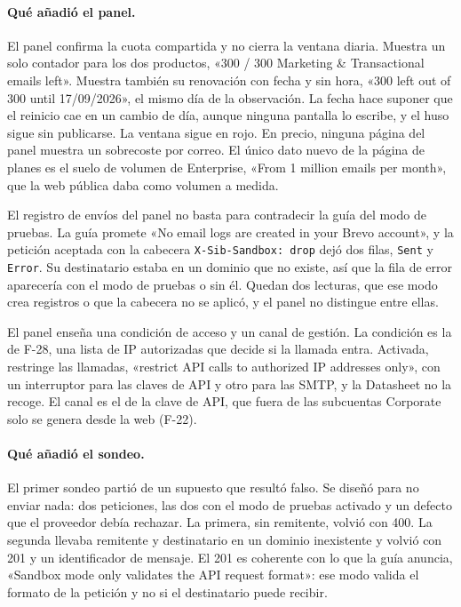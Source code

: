 \paragraph{Qué añadió el panel.} El panel confirma la cuota compartida y
no cierra la ventana diaria. Muestra un solo contador para los dos
productos, «300 / 300 Marketing \& Transactional emails left». Muestra
también su renovación con fecha y sin hora, «300 left out of 300 until
17/09/2026», el mismo día de la observación. La fecha hace suponer que el reinicio cae en un cambio de día, aunque ninguna pantalla lo escribe, y el huso sigue sin publicarse. La ventana sigue en rojo. En precio, ninguna página del panel muestra un sobrecoste por correo.
El único dato nuevo de la página de planes es el suelo de volumen de
Enterprise, «From 1 million emails per month», que la web pública daba
como volumen a medida.

El registro de envíos del panel no basta para contradecir la guía del modo de pruebas. La guía promete «No email logs
are created in your Brevo account», y la petición aceptada con la cabecera
\texttt{X-Sib-Sandbox: drop} dejó dos filas, \texttt{Sent} y
\texttt{Error}. Su destinatario estaba en un dominio que no existe, así que
la fila de error aparecería con el modo de pruebas o sin él. Quedan dos
lecturas, que ese modo crea registros o que la cabecera no se aplicó, y el
panel no distingue entre ellas.

El panel enseña una condición de acceso y un canal de gestión. La
condición es la de F-28, una lista de IP autorizadas que decide si la
llamada entra. Activada, restringe las llamadas, «restrict API calls to
authorized IP addresses only», con un interruptor para las claves de API y
otro para las SMTP, y la Datasheet no la recoge. El canal es el de la clave
de API, que fuera de las subcuentas Corporate solo se genera desde la web
(F-22).

\paragraph{Qué añadió el sondeo.} El primer sondeo partió de un supuesto que resultó falso. Se diseñó para no enviar nada: dos peticiones, las dos con el modo de pruebas activado y un defecto que el proveedor debía rechazar. La primera, sin remitente, volvió con 400. La segunda llevaba remitente y destinatario en un dominio inexistente y volvió con 201 y un identificador de mensaje. El 201 es coherente con lo que la guía anuncia, «Sandbox mode only validates the API request format»: ese modo valida el formato de la petición y no si el destinatario puede recibir.

